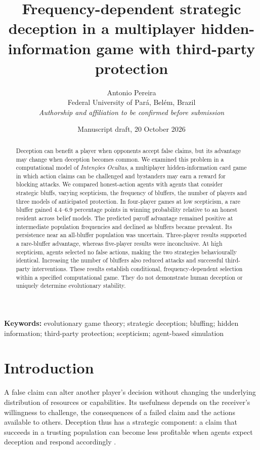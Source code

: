 \documentclass[11pt,a4paper]{article}
\title{Frequency-dependent strategic deception in a multiplayer hidden-information game with third-party protection}
\author{Antonio Pereira\\\small Federal University of Par\'a, Bel\'em, Brazil\\\small\textit{Authorship and affiliation to be confirmed before submission}}
\date{Manuscript draft, 20 October 2026}
\begin{document}
\maketitle

\begin{abstract}
Deception can benefit a player when opponents accept false claims, but its advantage may change when deception becomes common. We examined this problem in a computational model of \emph{Inten\c{c}\~oes Ocultas}, a multiplayer hidden-information card game in which action claims can be challenged and bystanders may earn a reward for blocking attacks. We compared honest-action agents with agents that consider strategic bluffs, varying scepticism, the frequency of bluffers, the number of players and three models of anticipated protection. In four-player games at low scepticism, a rare bluffer gained 4.4--6.9 percentage points in winning probability relative to an honest resident across belief models. The predicted payoff advantage remained positive at intermediate population frequencies and declined as bluffers became prevalent. Its persistence near an all-bluffer population was uncertain. Three-player results supported a rare-bluffer advantage, whereas five-player results were inconclusive. At high scepticism, agents selected no false actions, making the two strategies behaviourally identical. Increasing the number of bluffers also reduced attacks and successful third-party interventions. These results establish conditional, frequency-dependent selection within a specified computational game. They do not demonstrate human deception or uniquely determine evolutionary stability.
\end{abstract}
\noindent\textbf{Keywords:} evolutionary game theory; strategic deception; bluffing; hidden information; third-party protection; scepticism; agent-based simulation

\section{Introduction}
A false claim can alter another player's decision without changing the underlying distribution of resources or capabilities. Its usefulness depends on the receiver's willingness to challenge, the consequences of a failed claim and the actions available to others. Deception thus has a strategic component: a claim that succeeds in a trusting population can become less profitable when agents expect deception and respond accordingly \citep{searcy2005,mcnally2013}.
\end{document}
